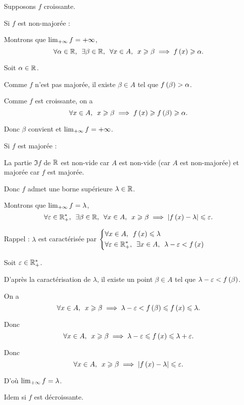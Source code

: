 \begin{dem}
Supposons \(f\) croissante.

Si \(f\) est non-majorée :

Montrons que \(\lim_{+\infty} f=+\infty\), \cad \[\quantifs{\forall\alpha\in\R;\exists\beta\in\R;\forall x\in A}x\geq\beta\imp f\paren{x}\geq\alpha.\]

Soit \(\alpha\in\mathbb{R}\).

Comme \(f\) n'est pas majorée, il existe \(\beta\in A\) tel que \(f\left(\beta\right)>\alpha\).

Comme \(f\) est croissante, on a \[\quantifs{\forall x\in A}x\geq\beta\imp f\paren{x}\geq f\paren{\beta}\geq\alpha.\]

Donc \(\beta\) convient et \(\lim_{+\infty}f=+\infty\).

Si \(f\) est majorée :

La partie \(\Im f\) de \(\mathbb{R}\) est non-vide car \(A\) est non-vide (car \(A\) est non-majorée) et majorée car \(f\) est majorée.

Donc \(f\) admet une borne supérieure \(\lambda\in\mathbb{R}\).

Montrons que \(\lim_{+\infty}f=\lambda\), \cad \[\quantifs{\forall\epsilon\in\Rps;\exists\beta\in\R;\forall x\in A}x\geq\beta\imp\abs{f\paren{x}-\lambda}\leq\epsilon.\]

Rappel : \(\lambda\) est caractérisée par \(\begin{dcases}\quantifs{\forall x\in A}f\paren{x}\leq\lambda \\ \quantifs{\forall\epsilon\in\Rps;\exists x\in A}\lambda-\epsilon<f\paren{x}\end{dcases}\)

Soit \(\varepsilon\in\mathbb{R}_+^*\).

D'après la caractérisation de \(\lambda\), il existe un point \(\beta\in A\) tel que \(\lambda-\varepsilon<f\left(\beta\right)\).

On a \[\quantifs{\forall x\in A}x\geq\beta\imp\lambda-\epsilon<f\paren{\beta}\leq f\paren{x}\leq\lambda.\]

Donc \[\quantifs{\forall x\in A}x\geq\beta\imp\lambda-\epsilon\leq f\paren{x}\leq\lambda+\epsilon.\]

Donc \[\quantifs{\forall x\in A}x\geq\beta\imp\abs{f\paren{x}-\lambda}\leq\epsilon.\]

D'où \(\lim_{+\infty}f=\lambda\).

Idem si \(f\) est décroissante.
\end{dem}

